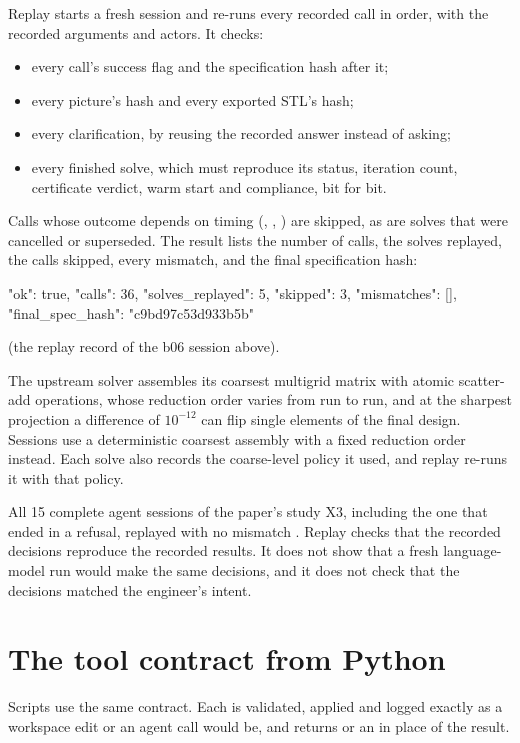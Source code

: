 Replay starts a fresh session and re-runs every recorded call in order, with the recorded arguments and actors. It
checks:
\begin{itemize}
  \item every call's success flag and the specification hash after it;
  \item every  picture's hash and every exported STL's hash;
  \item every clarification, by reusing the recorded answer instead of asking;
  \item every finished solve, which must reproduce its status, iteration count, certificate verdict, warm start and
  compliance, bit for bit.
\end{itemize}
Calls whose outcome depends on timing (, , ) are skipped, as are solves that
were cancelled or superseded. The result lists the number of calls, the solves replayed, the calls skipped, every
mismatch, and the final specification hash:

\begin{jsoncode}
{"ok": true, "calls": 36, "solves_replayed": 5, "skipped": 3, "mismatches": [],
 "final_spec_hash": "c9bd97c53d933b5b"}
\end{jsoncode}
(the replay record of the b06 session above).

\begin{notebox}
The upstream solver assembles its coarsest multigrid matrix with atomic scatter-add operations, whose reduction order
varies from run to run, and at the sharpest projection a difference of $10^{-12}$ can flip single elements of the final
design. Sessions use a deterministic coarsest assembly with a fixed reduction order instead. Each solve also records
the coarse-level policy it used, and replay re-runs it with that policy.
\end{notebox}

\begin{evidencebox}
All 15 complete agent sessions of the paper's study X3, including the one that ended in a refusal, replayed with no
mismatch . Replay checks that the recorded decisions reproduce the recorded results. It does not show that
a fresh language-model run would make the same decisions, and it does not check that the decisions matched the
engineer's intent.
\end{evidencebox}

\section{The tool contract from Python}\label{sec:python}
Scripts use the same contract. Each  is validated, applied and logged exactly as a workspace edit or an agent
call would be, and returns  or an  in place of the result.

